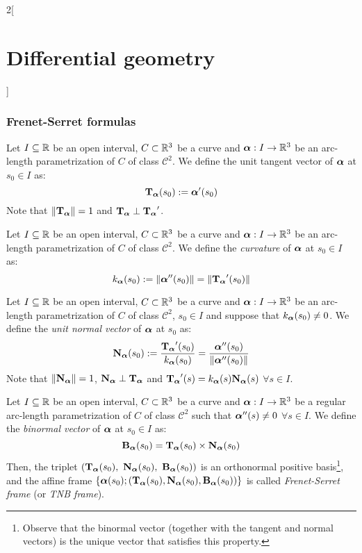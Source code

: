 \documentclass[../../../main_math.tex]{subfiles}
\begin{document}
\begin{multicols}{2}[\section{Differential geometry}]
  \subsubsection{Frenet-Serret formulas}
  \begin{definition}
    Let $I\subseteq\RR$ be an open interval, $C\subset\RR^3$ be a curve and $\vf{\alpha}:I\rightarrow\RR^3$ be an arc-length parametrization of $C$ of class $\mathcal{C}^2$. We define the unit tangent vector of $\vf{\alpha}$ at $s_0\in I$ as: $$\T\alpha(s_0):=\vf{\alpha}'(s_0)$$ Note that $\|\T\alpha\|=1$ and $\T\alpha\perp\T\alpha'$.
  \end{definition}
  \begin{definition}
    Let $I\subseteq\RR$ be an open interval, $C\subset\RR^3$ be a curve and $\vf{\alpha}:I\rightarrow\RR^3$ be an arc-length parametrization of $C$ of class $\mathcal{C}^2$. We define the \emph{curvature} of $\vf{\alpha}$ at $s_0\in I$ as: $$k_{\vf\alpha}(s_0):=\|\vf{\alpha}''(s_0)\|=\|\T\alpha'(s_0)\|$$
  \end{definition}
  \begin{definition}
    Let $I\subseteq\RR$ be an open interval, $C\subset\RR^3$ be a curve and $\vf{\alpha}:I\rightarrow\RR^3$ be an arc-length parametrization of $C$ of class $\mathcal{C}^2$, $s_0\in I$ and suppose that $k_{\vf\alpha}(s_0)\ne 0$. We define the \emph{unit normal vector} of $\vf{\alpha}$ at $s_0$ as: $$\N\alpha(s_0):=\frac{\T\alpha'(s_0)}{k_{\vf\alpha}(s_0)}=\frac{\vf{\alpha}''(s_0)}{\|\vf{\alpha}''(s_0)\|}$$
    Note that $\|\N\alpha\|=1$, $\N\alpha\perp\T\alpha$ and $\T\alpha'(s)=k_{\vf\alpha}(s)\N\alpha(s)$ $\forall s\in I$.
  \end{definition}
  \begin{definition}
    Let $I\subseteq\RR$ be an open interval, $C\subset\RR^3$ be a curve and $\vf{\alpha}:I\rightarrow\RR^3$ be a regular arc-length parametrization of $C$ of class $\mathcal{C}^2$ such that $\vf{\alpha}''(s)\ne 0$ $\forall s\in I$. We define the \emph{binormal vector} of $\vf{\alpha}$ at $s_0\in I$ as:
    $$\B\alpha(s_0)=\T\alpha(s_0)\times\N\alpha(s_0)$$
    Then, the triplet $(\T\alpha(s_0),\ \N\alpha(s_0),\ \B\alpha(s_0))$ is an orthonormal positive basis\footnote{Observe that the binormal vector (together with the tangent and normal vectors) is the unique vector that satisfies this property.}, and the affine frame $\{\vf{\alpha}(s_0); (\T\alpha(s_0),\N\alpha(s_0),\B\alpha(s_0))\}$ is called \emph{Frenet-Serret frame} (or \emph{TNB frame}).
  \end{definition}

\end{multicols}
\end{document}
